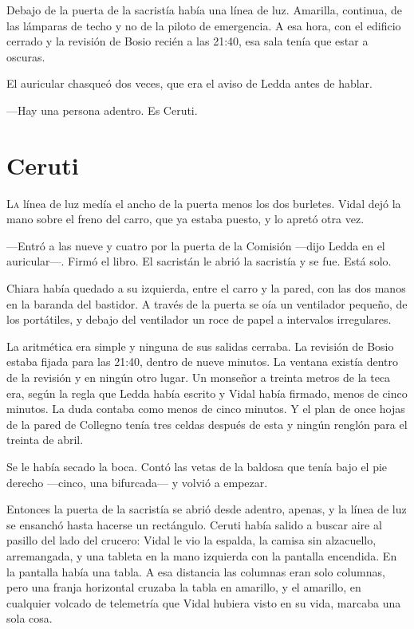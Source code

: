 Debajo de la puerta de la sacristía había una línea de luz. Amarilla, continua, de las lámparas de techo y no de la piloto de emergencia. A esa hora, con el edificio cerrado y la revisión de Bosio recién a las 21:40, esa sala tenía que estar a oscuras.

El auricular chasqueó dos veces, que era el aviso de Ledda antes de hablar.

---Hay una persona adentro. Es Ceruti.

\clearpage

\chapter{Ceruti}

\lettrine[lines=2, lhang=0.1, nindent=0.2em]{L}{a} línea de luz medía el ancho de la puerta menos los dos burletes. Vidal dejó la mano sobre el freno del carro, que ya estaba puesto, y lo apretó otra vez.


---Entró a las nueve y cuatro por la puerta de la Comisión ---dijo Ledda en el auricular---. Firmó el libro. El sacristán le abrió la sacristía y se fue. Está solo.

Chiara había quedado a su izquierda, entre el carro y la pared, con las dos manos en la baranda del bastidor. A través de la puerta se oía un ventilador pequeño, de los portátiles, y debajo del ventilador un roce de papel a intervalos irregulares.

La aritmética era simple y ninguna de sus salidas cerraba. La revisión de Bosio estaba fijada para las 21:40, dentro de nueve minutos. La ventana existía dentro de la revisión y en ningún otro lugar. Un monseñor a treinta metros de la teca era, según la regla que Ledda había escrito y Vidal había firmado, menos de cinco minutos. La duda contaba como menos de cinco minutos. Y el plan de once hojas de la pared de Collegno tenía tres celdas después de esta y ningún renglón para el treinta de abril.

Se le había secado la boca. Contó las vetas de la baldosa que tenía bajo el pie derecho ---cinco, una bifurcada--- y volvió a empezar.

Entonces la puerta de la sacristía se abrió desde adentro, apenas, y la línea de luz se ensanchó hasta hacerse un rectángulo. Ceruti había salido a buscar aire al pasillo del lado del crucero: Vidal le vio la espalda, la camisa sin alzacuello, arremangada, y una tableta en la mano izquierda con la pantalla encendida. En la pantalla había una tabla. A esa distancia las columnas eran solo columnas, pero una franja horizontal cruzaba la tabla en amarillo, y el amarillo, en cualquier volcado de telemetría que Vidal hubiera visto en su vida, marcaba una sola cosa.

